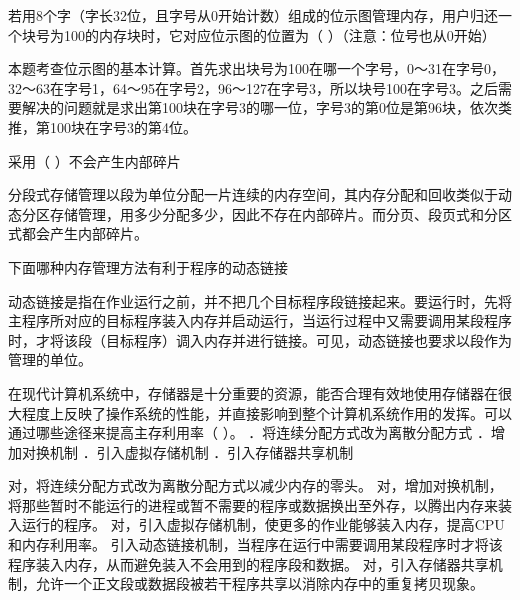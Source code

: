 \question 若用8个字（字长32位，且字号从0开始计数）组成的位示图管理内存，用户归还一个块号为100的内存块时，它对应位示图的位置为（
）（注意：位号也从0开始）
\par{}
\begin{solution}本题考查位示图的基本计算。首先求出块号为100在哪一个字号，0～31在字号0，32～63在字号1，64～95在字号2，96～127在字号3，所以块号100在字号3。之后需要解决的问题就是求出第100块在字号3的哪一位，字号3的第0位是第96块，依次类推，第100块在字号3的第4位。
\end{solution}
\question 采用（ ）不会产生内部碎片
\par{}
\begin{solution}分段式存储管理以段为单位分配一片连续的内存空间，其内存分配和回收类似于动态分区存储管理，用多少分配多少，因此不存在内部碎片。而分页、段页式和分区式都会产生内部碎片。
\end{solution}
\question 下面哪种内存管理方法有利于程序的动态链接
\par{}
\begin{solution}动态链接是指在作业运行之前，并不把几个目标程序段链接起来。要运行时，先将主程序所对应的目标程序装入内存并启动运行，当运行过程中又需要调用某段程序时，才将该段（目标程序）调入内存并进行链接。可见，动态链接也要求以段作为管理的单位。
\end{solution}
\question 在现代计算机系统中，存储器是十分重要的资源，能否合理有效地使用存储器在很大程度上反映了操作系统的性能，并直接影响到整个计算机系统作用的发挥。可以通过哪些途径来提高主存利用率（
）。 ．将连续分配方式改为离散分配方式 ．增加对换机制
．引入虚拟存储机制 ．引入存储器共享机制
\par{}
\begin{solution}对，将连续分配方式改为离散分配方式以减少内存的零头。
对，增加对换机制，将那些暂时不能运行的进程或暂不需要的程序或数据换出至外存，以腾出内存来装入运行的程序。
对，引入虚拟存储机制，使更多的作业能够装入内存，提高CPU和内存利用率。
引入动态链接机制，当程序在运行中需要调用某段程序时才将该程序装入内存，从而避免装入不会用到的程序段和数据。
对，引入存储器共享机制，允许一个正文段或数据段被若干程序共享以消除内存中的重复拷贝现象。
\end{solution}
